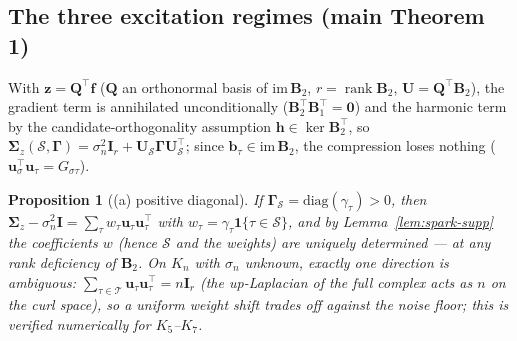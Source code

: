 \documentclass[11pt]{article}
\newtheorem{proposition}[theorem]{Proposition}
\DeclareMathOperator{\rank}{rank}
\newcommand{\B}{\bm{B}}
\newcommand{\Scal}{\mathcal{S}}
\newcommand{\Tcal}{\mathcal{T}}
\newcommand{\Gam}{\bm{\Gamma}}
\begin{document}
\subsection{The three excitation regimes (main Theorem 1)}

With $\bm z=\bm Q^{\!\top}\bm f$ ($\bm Q$ an orthonormal basis of
$\mathrm{im}\,\B_2$, $r=\rank\B_2$, $\bm U=\bm Q^{\!\top}\B_2$), the gradient
term is annihilated unconditionally ($\B_2^{\!\top}\B_1^{\!\top}=\bm0$) and
the harmonic term by the candidate-orthogonality assumption
$\bm h\in\ker\B_2^{\!\top}$, so
$\bm\Sigma_z(\Scal,\Gam)=\sigma_n^2\bm I_r+\bm U_\Scal\Gam\bm U_\Scal^{\!\top}$;
since $\bm b_\tau\in\mathrm{im}\,\B_2$, the compression loses nothing
($\bm u_\sigma^{\!\top}\bm u_\tau=G_{\sigma\tau}$).

\begin{proposition}[(a) positive diagonal]\label{prop:diag}
If $\Gam_\Scal=\mathrm{diag}(\gamma_\tau)>0$, then
$\bm\Sigma_z-\sigma_n^2\bm I=\sum_\tau w_\tau\bm u_\tau\bm u_\tau^{\!\top}$
with $w_\tau=\gamma_\tau\mathbf 1\{\tau\in\Scal\}$, and by
Lemma~\ref{lem:spark-supp} the coefficients $w$ (hence $\Scal$ and the
weights) are uniquely determined --- at any rank deficiency of $\B_2$. On
$K_n$ with $\sigma_n$ \emph{unknown}, exactly one direction is ambiguous:
$\sum_{\tau\in\Tcal}\bm u_\tau\bm u_\tau^{\!\top}=n\bm I_r$ (the up-Laplacian
of the full complex acts as $n$ on the curl space), so a uniform weight shift
trades off against the noise floor; this is verified numerically for
$K_5$--$K_7$.
\end{proposition}
\end{document}
